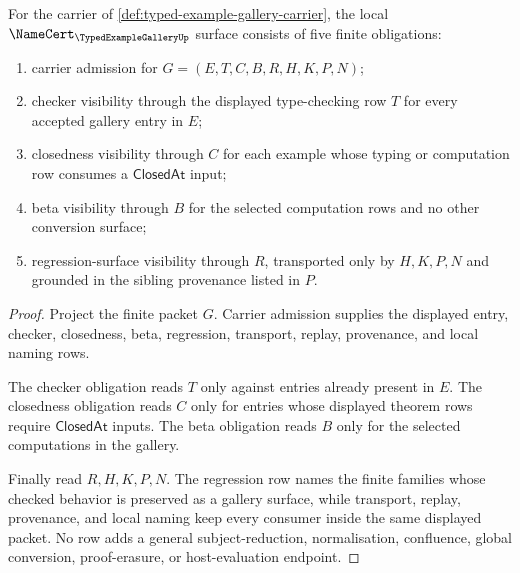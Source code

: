 \begin{theorem}
\label{thm:typed-example-gallery-namecert-obligations}
For the carrier of \autoref{def:typed-example-gallery-carrier}, the local $\NameCert_{\TypedExampleGalleryUp}$ surface consists of five finite obligations:
\begin{enumerate}
\item carrier admission for $G=(E,T,C,B,R,H,K,P,N)$;
\item checker visibility through the displayed type-checking row $T$ for every accepted gallery entry in $E$;
\item closedness visibility through $C$ for each example whose typing or computation row consumes a $\mathsf{ClosedAt}$ input;
\item beta visibility through $B$ for the selected computation rows and no other conversion surface;
\item regression-surface visibility through $R$, transported only by $H,K,P,N$ and grounded in the sibling provenance listed in $P$.
\end{enumerate}
\end{theorem}
\begin{proof}
Project the finite packet $G$. Carrier admission supplies the displayed entry, checker, closedness, beta, regression, transport, replay, provenance, and local naming rows.

The checker obligation reads $T$ only against entries already present in $E$. The closedness obligation reads $C$ only for entries whose displayed theorem rows require $\mathsf{ClosedAt}$ inputs. The beta obligation reads $B$ only for the selected computations in the gallery.

Finally read $R,H,K,P,N$. The regression row names the finite families whose checked behavior is preserved as a gallery surface, while transport, replay, provenance, and local naming keep every consumer inside the same displayed packet. No row adds a general subject-reduction, normalisation, confluence, global conversion, proof-erasure, or host-evaluation endpoint.
\end{proof}

